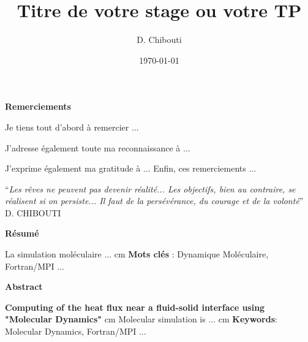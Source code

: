 \documentclass{DChibouti}
\title{Titre de votre stage ou votre TP}
\author{D. Chibouti}
\date{\today}
\begin{document}
\maketitle  %

\clearpage
%
\vspace*{0.05\textheight}
\begin{center} 
\Huge\textbf{Remerciements} 
\end{center}
\thispagestyle{empty}

\vspace*{0.05\textheight}

Je tiens tout d’abord à remercier ...

\vspace*{0.03\textheight}
J'adresse également toute ma reconnaissance à ...

\vspace*{0.03\textheight}
J’exprime également ma gratitude à ...
\vspace*{0.03\textheight}
Enfin, ces remerciements ...

\vspace*{0.05\textheight}
\noindent\enquote{\itshape Les rêves ne peuvent pas devenir réalité... Les objectifs, bien au contraire, se réalisent si on persiste... Il faut de la persévérance, du courage et de la volonté}
\bigbreak
\hfill D. CHIBOUTI


\newpage
\vspace*{0.05\textheight}

\begin{center} 
\Huge\textbf{Résumé} 
\end{center}

La simulation moléculaire ...
 cm
\textbf{Mots clés} : Dynamique Moléculaire, Fortran/MPI ... 

 
\begin{center} 
\Huge\textbf{Abstract} 
\end{center} 

\textbf{Computing of the heat flux near a fluid-solid interface using "Molecular Dynamics"}
 cm
Molecular simulation is ...
 cm
\textbf{Keywords}: Molecular Dynamics, Fortran/MPI ...
 

\tableofcontents
\listoffigures
\listoftables
\makenomenclature
\clearpage
\end{document}
